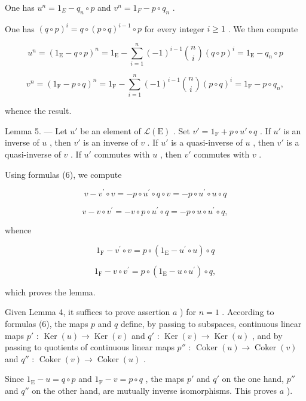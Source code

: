One has \(u^{n}=1_{E}-q_{n}\circ p\) and \(v^{n}=1_{F}-p\circ q_{n}\) .

One has \((q\circ p)^{i} = q\circ (p\circ q)^{i - 1}\circ p\) for every integer \(i\geqslant 1\) . We then compute

\[
u ^ {n} = (1 _ {\mathrm{E}} - q \circ p) ^ {n} = 1 _ {\mathrm{E}} - \sum_ {i = 1} ^ {n} (- 1) ^ {i - 1} {\binom {n} {i}} (q \circ p) ^ {i} = 1 _ {\mathrm{E}} - q _ {n} \circ p
\]

\[
v ^ {n} = (1 _ {\mathrm{F}} - p \circ q) ^ {n} = 1 _ {\mathrm{F}} - \sum_ {i = 1} ^ {n} (- 1) ^ {i - 1} \binom {n} {i} (p \circ q) ^ {i} = 1 _ {\mathrm{F}} - p \circ q _ {n},
\]

whence the result.

Lemma 5. --- Let \(u'\) be an element of \(\mathcal{L}(\mathrm{E})\) . Set \(v' = 1_{\mathrm{F}} + p \circ u' \circ q\) . If \(u'\) is an inverse of \(u\) , then \(v'\) is an inverse of \(v\) . If \(u'\) is a quasi-inverse of \(u\) , then \(v'\) is a quasi-inverse of \(v\) . If \(u'\) commutes with \(u\) , then \(v'\) commutes with \(v\) .

Using formulas (6), we compute

\[
v - v ^ {\prime} \circ v = - p \circ u ^ {\prime} \circ q \circ v = - p \circ u ^ {\prime} \circ u \circ q
\]

\[
v - v \circ v ^ {\prime} = - v \circ p \circ u ^ {\prime} \circ q = - p \circ u \circ u ^ {\prime} \circ q,
\]

whence

\[
1 _ {\mathrm{F}} - v ^ {\prime} \circ v = p \circ (1 _ {\mathrm{E}} - u ^ {\prime} \circ u) \circ q
\]

\[
1 _ {\mathrm{F}} - v \circ v ^ {\prime} = p \circ (1 _ {\mathrm{E}} - u \circ u ^ {\prime}) \circ q,
\]

which proves the lemma.

Given Lemma 4, it suffices to prove assertion \(a\) ) for \(n = 1\) . According to formulas (6), the maps \(p\) and \(q\) define, by passing to subspaces, continuous linear maps \(p'\) : \(\operatorname{Ker}(u) \to \operatorname{Ker}(v)\) and \(q'\) : \(\operatorname{Ker}(v) \to \operatorname{Ker}(u)\) , and by passing to quotients of continuous linear maps \(p''\) : \(\operatorname{Coker}(u) \to \operatorname{Coker}(v)\) and \(q''\) : \(\operatorname{Coker}(v) \to \operatorname{Coker}(u)\) .

Since \(1_{\mathrm{E}} - u = q \circ p\) and \(1_{\mathrm{F}} - v = p \circ q\) , the maps \(p'\) and \(q'\) on the one hand, \(p''\) and \(q''\) on the other hand, are mutually inverse isomorphisms. This proves \(a\) ).


